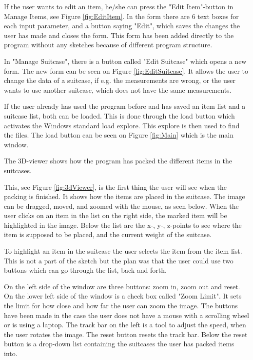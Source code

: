 If the user wants to edit an item, he/she can press the "Edit Item"-button in Manage Items, see Figure \ref{fig:EditItem}. In the form there are 6 text boxes for each input parameter, and a button saying "Edit", which saves the changes the user has made and closes the form. This form has been added directly to the program without any sketches because of different program structure.

In "Manage Suitcase", there is a button called "Edit Suitcase" which opens a new form. The new form can be seen on Figure \ref{fig:EditSuitcase}. It allows the user to change the data of a suitcase, if e.g. the measurements are wrong, or the user wants to use another suitcase, which does not have the same measurements.

If the user already has used the program before and has saved an item list and a suitcase list, both can be loaded. This is done through the load button which activates the Windows standard load explore. This explore is then used to find the files. The load button can be seen on Figure \ref{fig:Main} which is the main window.

The 3D-viewer shows how the program has packed the different items in the suitcases.


This, see Figure \ref{fig:3dViewer}, is the first thing the user will see when the packing is finished. It shows how the items are placed in the suitcase.
The image can be dragged, moved, and zoomed with the mouse, as seen below. When the user clicks on an item in the list on the right side, the marked item will be highlighted in the image. Below the list are the x-, y-, z-points to see where the item is supposed to be placed, and the current weight of the suitcase.

To highlight an item in the suitcase the user selects the item from the item list. This is not a part of the sketch but the plan was that the user could use two buttons which can go through the list, back and forth.

On the left side of the window are three buttons: zoom in, zoom out and reset. On the lower left side of the window is a check box called "Zoom Limit". It sets the limit for how close and how far the user can zoom the image. The buttons have been made in the case the user does not have a mouse with a scrolling wheel or is using a laptop. The track bar on the left is a tool to adjust the speed, when the user rotates the image. The reset button resets the track bar. Below the reset button is a drop-down list containing the suitcases the user has packed items into.


